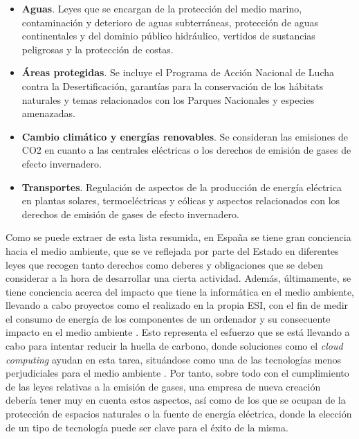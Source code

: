 \begin{itemize}
    \item \textbf{Aguas}. Leyes que se encargan de la protección del medio marino, contaminación y deterioro de aguas subterráneas, protección de aguas continentales y del dominio público hidráulico, vertidos de sustancias peligrosas y la protección de costas.
    
    \clearpage
    
    \item \textbf{Áreas protegidas}. Se incluye el Programa de Acción Nacional de Lucha contra la Desertificación, garantías para la conservación de los hábitats naturales y temas relacionados con los Parques Nacionales y especies amenazadas.
    
    \item \textbf{Cambio climático y energías renovables}. Se consideran las emisiones de CO2 en cuanto a las centrales eléctricas o los derechos de emisión de gases de efecto invernadero.
    
    \item \textbf{Transportes}. Regulación de aspectos de la producción de energía eléctrica en plantas solares, termoeléctricas y eólicas y aspectos relacionados con los derechos de emisión de gases de efecto invernadero.
\end{itemize}

Como se puede extraer de esta lista resumida, en España se tiene gran conciencia hacia el medio ambiente, que se ve reflejada por parte del Estado en diferentes leyes que recogen tanto derechos como deberes y obligaciones que se deben considerar a la hora de desarrollar una cierta actividad. Además, últimamente, se tiene conciencia acerca del impacto que tiene la informática en el medio ambiente, llevando a cabo proyectos como el realizado en la propia \acf{ESI}, con el fin de medir el consumo de energía de los componentes de un ordenador y su consecuente impacto en el medio ambiente \cite{auroragalisteo2019}. Esto representa el esfuerzo que se está llevando a cabo para intentar reducir la huella de carbono, donde soluciones como el \textit{cloud computing} ayudan en esta tarea, situándose como una de las tecnologías menos perjudiciales para el medio ambiente \cite{keyandcloud2018}. Por tanto, sobre todo con el cumplimiento de las leyes relativas a la emisión de gases, una empresa de nueva creación debería tener muy en cuenta estos aspectos, así como de los que se ocupan de la protección de espacios naturales o la fuente de energía eléctrica, donde la elección de un tipo de tecnología puede ser clave para el éxito de la misma.

